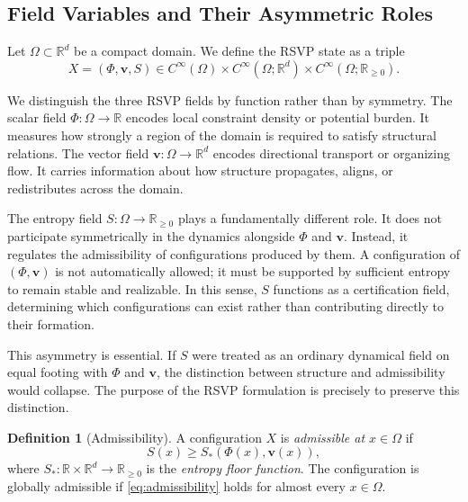 \documentclass[11pt]{article}
\theoremstyle{definition}
\newtheorem{definition}[theorem]{Definition}
\begin{document}
\subsection{Field Variables and Their Asymmetric Roles}

Let $\Omega \subset \mathbb{R}^d$ be a compact domain. We define the RSVP
state as a triple
\begin{equation}
  X = (\Phi, \mathbf{v}, S) \in C^\infty(\Omega) \times
      C^\infty(\Omega;\mathbb{R}^d) \times
      C^\infty(\Omega;\mathbb{R}_{\ge 0}).
\end{equation}

We distinguish the three RSVP fields by function rather than by symmetry. The
scalar field $\Phi : \Omega \to \mathbb{R}$ encodes local constraint density or
potential burden. It measures how strongly a region of the domain is required to
satisfy structural relations. The vector field $\mathbf{v} : \Omega \to
\mathbb{R}^d$ encodes directional transport or organizing flow. It carries
information about how structure propagates, aligns, or redistributes across the
domain.

The entropy field $S : \Omega \to \mathbb{R}_{\ge 0}$ plays a fundamentally
different role. It does not participate symmetrically in the dynamics alongside
$\Phi$ and $\mathbf{v}$. Instead, it regulates the admissibility of
configurations produced by them. A configuration of $(\Phi,\mathbf{v})$ is not
automatically allowed; it must be supported by sufficient entropy to remain
stable and realizable. In this sense, $S$ functions as a certification field,
determining which configurations can exist rather than contributing directly to
their formation.

This asymmetry is essential. If $S$ were treated as an ordinary dynamical field
on equal footing with $\Phi$ and $\mathbf{v}$, the distinction between
structure and admissibility would collapse. The purpose of the RSVP formulation
is precisely to preserve this distinction.

\begin{definition}[Admissibility]
  A configuration $X$ is \emph{admissible at $x \in \Omega$} if
  \begin{equation}
    S(x) \ge S_*(\Phi(x), \mathbf{v}(x)),
    \label{eq:admissibility}
  \end{equation}
  where $S_* : \mathbb{R} \times \mathbb{R}^d \to \mathbb{R}_{\ge 0}$ is the
  \emph{entropy floor function}. The configuration is globally admissible if
  \eqref{eq:admissibility} holds for almost every $x \in \Omega$.
\end{definition}
\end{document}
